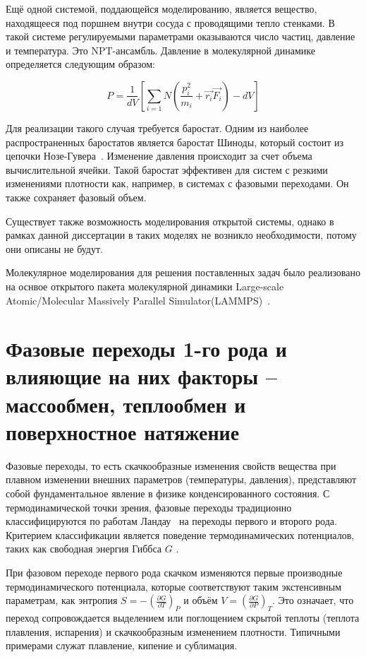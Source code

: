 Ещё одной системой, поддающейся моделированию, является вещество, находящееся под поршнем внутри сосуда с проводящими тепло стенками. В такой системе регулируемыми параметрами оказываются число частиц, давление и температура. Это NPT-ансамбль. Давление в молекулярной динамике определяется следующим образом:

\begin{equation}
    P = \frac{1}{dV}[\sum_{i=1}{N}(\frac{p_i^2}{m_i} + \vec{r_i} \vec{F_i}) - dV]
\end{equation}

Для реализации такого случая требуется баростат. Одним из наиболее распространенных баростатов является баростат Шиноды, который состоит из цепочки Нозе-Гувера~\cite{Shinoda}. Изменение давления происходит за счет объема вычислительной ячейки. Такой баростат эффективен для систем с резкими изменениями плотности как, например, в системах с фазовыми переходами. Он также сохраняет фазовый объем.

Существует также возможность моделирования открытой системы, однако в рамках данной диссертации в таких моделях не возникло необходимости, потому они описаны не будут.

Молекулярное моделирования для решения поставленных задач было реализовано на оснвое открытого пакета молекулярной динамики Large-scale Atomic/Molecular Massively Parallel Simulator(LAMMPS)~\cite{thompson_lammps_2022}.


\section{Фазовые переходы 1-го рода и влияющие на них факторы – массообмен, теплообмен и поверхностное натяжение}

Фазовые переходы, то есть скачкообразные изменения свойств вещества при плавном изменении внешних параметров (температуры, давления), представляют собой фундаментальное явление в физике конденсированного состояния. С термодинамической точки зрения, фазовые переходы традиционно классифицируются по работам Ландау~\cite{landau5} на переходы первого и второго рода. Критерием классификации является поведение термодинамических потенциалов, таких как свободная энергия Гиббса $G$ .

При фазовом переходе первого рода скачком изменяются первые производные термодинамического потенциала, которые соответствуют таким экстенсивным параметрам, как энтропия  $S = -\left(\frac{\partial G}{\partial T}\right)_P$  и объём  $V = \left(\frac{\partial G}{\partial P}\right)_T$. Это означает, что переход сопровождается выделением или поглощением скрытой теплоты (теплота плавления, испарения) и скачкообразным изменением плотности. Типичными примерами служат плавление, кипение и сублимация.

